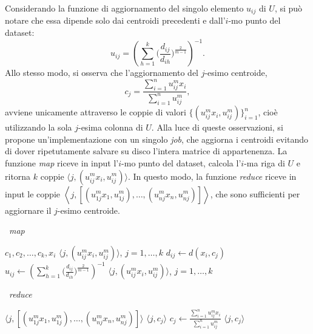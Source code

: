 \documentclass[runningheads]{llncs}
\begin{document}
Considerando la funzione di aggiornamento del singolo elemento $u_{ij}$ di $U$, si può notare che essa dipende solo dai centroidi precedenti e dall'$i$-mo punto del dataset:
\[
    u_{ij} = \left(\sum_{h=1}^{k} \Big(\frac{d_{ij}}{d_{ih}}\Big)^{\frac{2}{m-1}}\right)^{-1}.
\]
Allo stesso modo, si osserva che l'aggiornamento del $j$-esimo centroide,
\[
    c_j = \frac{\sum_{i=1}^{n} u_{ij}^{m}x_i}{\sum_{i=1}^{n} u_{ij}^{m}},
\]
avviene unicamente attraverso le coppie di valori $\{(u_{ij}^{m}x_i, u_{ij}^{m})\}_{i=1}^n$, cioè utilizzando la sola $j$-esima colonna di $U$. Alla luce di queste osservazioni, si propone un'implementazione con un singolo \textit{job}, che aggiorna i centroidi evitando di dover ripetutamente salvare su disco l'intera matrice di appartenenza.
La funzione \textit{map} riceve in input l'$i$-mo punto del dataset, calcola l'$i$-ma riga di $U$ e ritorna $k$ coppie $\langle j, (u_{ij}^{m} x_i, u_{ij}^{m}) \rangle $. In questo modo, la funzione \textit{reduce} riceve in input le coppie $\left< j, [(u_{1j}^{m} x_1, u_{1j}^{m}), \ldots, (u_{nj}^{m}x_n, u_{nj}^{m})]\right>$, che sono sufficienti per aggiornare il $j$-esimo centroide.



\begin{minipage}[t]{0.48\textwidth}
\begin{algorithm}[H]
\caption{\fcm\ \textit{map}}
\begin{algorithmic}[1]
    \Require $c_1, c_2, \ldots, c_k, x_i$
    \Ensure $\langle j, (u_{ij}^{m} x_i, u_{ij}^{m}) \rangle $, $j = 1, \ldots, k$
        \State $d_{ij} \leftarrow d(x_i, c_j)$
    \EndFor
        \State $u_{ij} \leftarrow \left(\sum_{h=1}^{k} \Big(\frac{d_{ij}}{d_{ih}}\Big)^{\frac{2}{m-1}}\right)^{-1} $ 
    \EndFor
    \State \Return $\langle j, (u_{ij}^{m}x_i, u_{ij}^{m}) \rangle $, $j = 1, \ldots, k$
\end{algorithmic}
\end{algorithm}
\end{minipage}
\hspace{\fill}
\begin{minipage}[t]{0.48\textwidth}
\begin{algorithm}[H]
\caption{\fcm\ \textit{reduce}}
\begin{algorithmic}[1]
    \Require $\langle j, [(u_{1j}^{m} x_1, u_{1j}^{m}), \ldots, (u_{nj}^{m}x_n, u_{nj}^{m})]\rangle $
    \Ensure $\langle j, c_j \rangle$
    \State $c_j \leftarrow \frac{\sum_{i=1}^{n} u_{ij}^{m}x_i}{\sum_{i=1}^{n} u_{ij}^{m}} $
    \State\Return $\langle j, c_j \rangle $
\end{algorithmic}
\end{algorithm}
\end{minipage}
\end{document}

